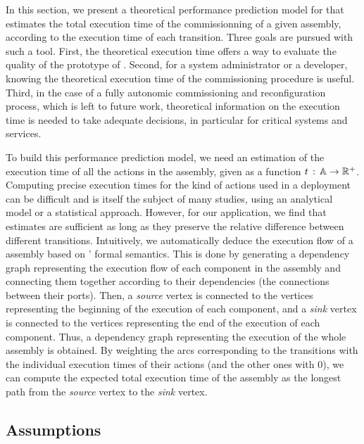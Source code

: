 In this section, we present a theoretical performance prediction model
for \mad that estimates the total execution time of the
commissionning of a given assembly, according to the execution time of
each transition. Three goals are pursued with such a tool. First, the
theoretical execution time offers a way to evaluate the quality of the
prototype of \mad. Second, for a system administrator or a developer,
knowing the theoretical execution time of the commissioning procedure
is useful. Third, in the case of a fully autonomic commissioning and
reconfiguration process, which is left to future work, theoretical
information on the execution time is needed to take adequate
decisions, in particular for critical systems and services.

To build this performance prediction model, we need an estimation of
the execution time of all the actions in the assembly, given as a
function $t\,:\,\mathbb{A}\rightarrow\mathbb{R}^+$.  Computing
precise execution times for the kind of actions used in a deployment
can be difficult and is itself the subject of many studies, \eg using
an analytical model or a statistical approach. However, for our
application, we find that estimates are sufficient as long as they preserve
the relative difference between different transitions.
%
Intuitively, we automatically deduce the execution flow of a \mad
assembly based on \mad' formal semantics. This is done by generating a
dependency graph representing the execution flow of each \mad
component in the assembly and connecting them together according to their
dependencies (the connections between their ports). Then, a
\emph{source} vertex is connected to the vertices representing the beginning of
the execution of each component, and a \emph{sink} vertex is connected to
the vertices representing the end of the execution of each component.
%
Thus, a dependency graph representing the execution of the whole
assembly is obtained. By weighting the arcs corresponding to the transitions with
the individual execution times of their actions (and the other ones with 0),
we can compute the expected total execution time of the assembly as the
longest path from the \emph{source} vertex to the \emph{sink} vertex.


\subsection{Assumptions}

